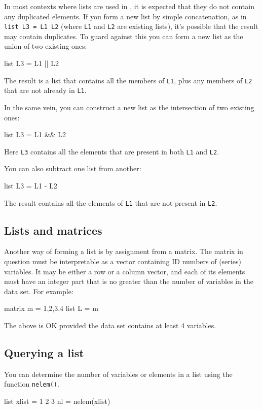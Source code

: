 In most contexts where lists are used in , it is expected
that they do not contain any duplicated elements.  If you form a new
list by simple concatenation, as in \texttt{list L3 = L1 L2}
(where \texttt{L1} and \texttt{L2} are existing lists), it's possible
that the result may contain duplicates.  To guard against this you can
form a new list as the union of two existing ones:
%
\begin{code}
list L3 = L1 || L2
\end{code}
%
The result is a list that contains all the members of \texttt{L1},
plus any members of \texttt{L2} that are not already in \texttt{L1}.

In the same vein, you can construct a new list as the intersection of
two existing ones:
%
\begin{code}
list L3 = L1 && L2
\end{code}
%
Here \texttt{L3} contains all the elements that are present in both
\texttt{L1} and \texttt{L2}.

You can also subtract one list from another:
%
\begin{code}
list L3 = L1 - L2
\end{code}
%
The result contains all the elements of \texttt{L1} that are not 
present in \texttt{L2}.


\subsection{Lists and matrices}

Another way of forming a list is by assignment from a matrix.  The
matrix in question must be interpretable as a vector containing ID
numbers of (series) variables.  It may be either a row or a column
vector, and each of its elements must have an integer part that is
no greater than the number of variables in the data set.  For example:
%
\begin{code}
matrix m = {1,2,3,4}
list L = m
\end{code}
%
The above is OK provided the data set contains at least 4 variables.

\subsection{Querying a list}

You can determine the number of variables or elements in a list
using the function \texttt{nelem()}.
%
\begin{code}
list xlist = 1 2 3
nl = nelem(xlist)
\end{code}

